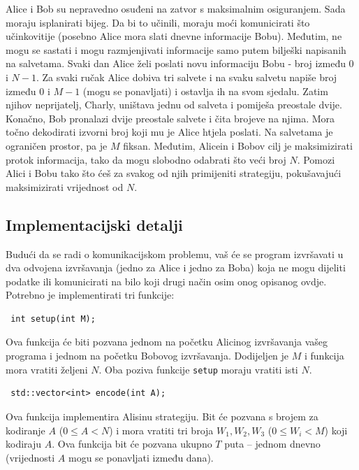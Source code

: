 \documentclass[12pt]{article}
\begin{document}
\renewcommand{\round}{Dan 1}
\renewcommand{\problemName}{Zadatak Zatvor}
\renewcommand{\lang}{Hrvatski}

\renewcommand{\tl}{$2$ sek.}
\renewcommand{\ml}{$1024$ MB}
\problem{\problemName}

Alice i Bob su nepravedno osuđeni na zatvor s maksimalnim osiguranjem. Sada moraju isplanirati bijeg. Da bi to učinili, moraju moći komunicirati što učinkovitije (posebno Alice mora slati dnevne informacije Bobu). Međutim, ne mogu se sastati i mogu razmjenjivati informacije samo putem bilješki napisanih na salvetama. Svaki dan Alice želi poslati novu informaciju Bobu - broj između $0$ i $N-1$. Za svaki ručak Alice dobiva tri salvete i na svaku salvetu napiše broj između $0$ i $M-1$ (mogu se ponavljati) i ostavlja ih na svom sjedalu. Zatim njihov neprijatelj, Charly, uništava jednu od salveta i pomiješa preostale dvije. Konačno, Bob pronalazi dvije preostale salvete i čita brojeve na njima. Mora točno dekodirati izvorni broj koji mu je Alice htjela poslati. Na salvetama je ograničen prostor, pa je $M$ fiksan. Međutim, Alicein i Bobov cilj je maksimizirati protok informacija, tako da mogu slobodno odabrati što veći broj $N$. Pomozi Alici i Bobu tako što ćeš za svakog od njih primijeniti strategiju, pokušavajući maksimizirati vrijednost od $N$.

\subsection{Implementacijski detalji}
Budući da se radi o komunikacijskom problemu, vaš će se program izvršavati u dva odvojena izvršavanja (jedno za Alice i jedno za Boba) koja ne mogu dijeliti podatke ili komunicirati na bilo koji drugi način osim onog opisanog ovdje. Potrebno je implementirati tri funkcije:

\begin{lstlisting}
 int setup(int M);
\end{lstlisting}

Ova funkcija će biti pozvana jednom na početku Alicinog izvršavanja vašeg programa i jednom na početku Bobovog izvršavanja. Dodijeljen je $M$ i funkcija mora vratiti željeni $N$. Oba poziva funkcije \texttt{setup} moraju vratiti isti $N$.

\begin{lstlisting}
 std::vector<int> encode(int A);
\end{lstlisting}

Ova funkcija implementira Alisinu strategiju. Bit će pozvana s brojem za kodiranje $A$ ($0 \leq A < N$) i mora vratiti tri broja $W_1, W_2, W_3$ ($0 \leq W_i < M$) koji kodiraju $A$. Ova funkcija bit će pozvana ukupno $T$ puta -- jednom dnevno (vrijednosti $A$ mogu se ponavljati između dana).
\end{document}
